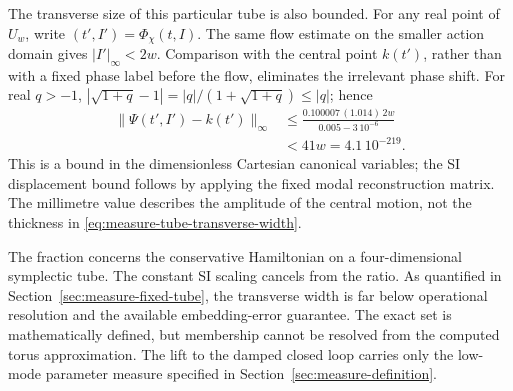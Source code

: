 The transverse size of this particular tube is also bounded. For any
real point of $U_w$, write $(t',I')=\Phi_\chi(t,I)$. The same flow
estimate on the smaller action domain gives $|I'|_\infty<2w$.
Comparison with the central point $k(t')$, rather than with a fixed
phase label before the flow, eliminates the irrelevant phase shift.
For real $q>-1$, $|\sqrt{1+q}-1|
=|q|/(1+\sqrt{1+q})\leq|q|$; hence
\begin{equation}
 \begin{aligned}
 \|\Psi(t',I')-k(t')\|_\infty
 &\leq\frac{0.100007\,(1.014)\,2w}{0.005-3\,10^{-6}}\\
 &<41w=4.1\,10^{-219}.
 \end{aligned}
 \label{eq:measure-tube-transverse-width}
\end{equation}
This is a bound in the dimensionless Cartesian canonical variables;
the SI displacement bound follows by applying the fixed modal
reconstruction matrix. The millimetre value describes the amplitude
of the central motion, not the thickness in
\eqref{eq:measure-tube-transverse-width}.

The fraction concerns the conservative Hamiltonian on a four-dimensional
symplectic tube. The constant SI scaling cancels from the ratio.
As quantified in Section~\ref{sec:measure-fixed-tube}, the transverse width
is far below operational resolution and the available embedding-error
guarantee. The exact set is mathematically defined, but membership cannot
be resolved from the computed torus approximation. The lift to the damped
closed loop carries only the low-mode parameter measure specified in
Section~\ref{sec:measure-definition}.
